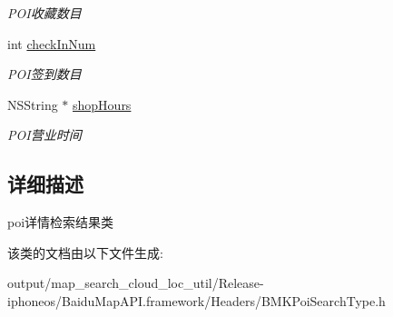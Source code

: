 \begin{DoxyCompactItemize}
\begin{DoxyCompactList}\small\item\em P\+O\+I收藏数目 \end{DoxyCompactList}\item 
\hypertarget{interface_b_m_k_poi_detail_result_aeb7c140cbab374cb4a1171d9b0110e47}{}int \hyperlink{interface_b_m_k_poi_detail_result_aeb7c140cbab374cb4a1171d9b0110e47}{check\+In\+Num}\label{interface_b_m_k_poi_detail_result_aeb7c140cbab374cb4a1171d9b0110e47}

\begin{DoxyCompactList}\small\item\em P\+O\+I签到数目 \end{DoxyCompactList}\item 
\hypertarget{interface_b_m_k_poi_detail_result_abc1d7ae185ffba432cf72148c9a896dd}{}N\+S\+String $\ast$ \hyperlink{interface_b_m_k_poi_detail_result_abc1d7ae185ffba432cf72148c9a896dd}{shop\+Hours}\label{interface_b_m_k_poi_detail_result_abc1d7ae185ffba432cf72148c9a896dd}

\begin{DoxyCompactList}\small\item\em P\+O\+I营业时间 \end{DoxyCompactList}\end{DoxyCompactItemize}


\subsection{详细描述}
poi详情检索结果类 

该类的文档由以下文件生成\+:\begin{DoxyCompactItemize}
\item 
output/map\+\_\+search\+\_\+cloud\+\_\+loc\+\_\+util/\+Release-\/iphoneos/\+Baidu\+Map\+A\+P\+I.\+framework/\+Headers/B\+M\+K\+Poi\+Search\+Type.\+h\end{DoxyCompactItemize}
